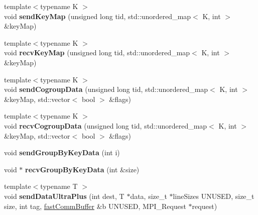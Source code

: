 \begin{DoxyCompactItemize}
\item 
\hypertarget{classfaster_1_1fastComm_a90b5d29b062108758932e1eefa22ab64}{}{\footnotesize template$<$typename K $>$ }\\void {\bfseries send\+Key\+Map} (unsigned long tid, std\+::unordered\+\_\+map$<$ K, int $>$ \&key\+Map)\label{classfaster_1_1fastComm_a90b5d29b062108758932e1eefa22ab64}

\item 
\hypertarget{classfaster_1_1fastComm_a4367717fa6627c940d777204a26b0a89}{}{\footnotesize template$<$typename K $>$ }\\void {\bfseries recv\+Key\+Map} (unsigned long tid, std\+::unordered\+\_\+map$<$ K, int $>$ \&key\+Map)\label{classfaster_1_1fastComm_a4367717fa6627c940d777204a26b0a89}

\item 
\hypertarget{classfaster_1_1fastComm_a1794035cdede41cb34034aa85fd510c3}{}{\footnotesize template$<$typename K $>$ }\\void {\bfseries send\+Cogroup\+Data} (unsigned long tid, std\+::unordered\+\_\+map$<$ K, int $>$ \&key\+Map, std\+::vector$<$ bool $>$ \&flags)\label{classfaster_1_1fastComm_a1794035cdede41cb34034aa85fd510c3}

\item 
\hypertarget{classfaster_1_1fastComm_ae7cea23c2c6dc47ac9e115685163d0c9}{}{\footnotesize template$<$typename K $>$ }\\void {\bfseries recv\+Cogroup\+Data} (unsigned long tid, std\+::unordered\+\_\+map$<$ K, int $>$ \&key\+Map, std\+::vector$<$ bool $>$ \&flags)\label{classfaster_1_1fastComm_ae7cea23c2c6dc47ac9e115685163d0c9}

\item 
\hypertarget{classfaster_1_1fastComm_a1c1f95981846c4ef1b5aca1d44ed6fdf}{}void {\bfseries send\+Group\+By\+Key\+Data} (int i)\label{classfaster_1_1fastComm_a1c1f95981846c4ef1b5aca1d44ed6fdf}

\item 
\hypertarget{classfaster_1_1fastComm_a973e9179e448b48785d20ad05d6f2fdd}{}void $\ast$ {\bfseries recv\+Group\+By\+Key\+Data} (int \&size)\label{classfaster_1_1fastComm_a973e9179e448b48785d20ad05d6f2fdd}

\item 
\hypertarget{classfaster_1_1fastComm_a5572027981936643d12277c7e47bf54d}{}{\footnotesize template$<$typename T $>$ }\\void {\bfseries send\+Data\+Ultra\+Plus} (int dest, T $\ast$data, size\+\_\+t $\ast$line\+Sizes U\+N\+U\+S\+E\+D, size\+\_\+t size, int tag, \hyperlink{classfaster_1_1fastCommBuffer}{fast\+Comm\+Buffer} \&b U\+N\+U\+S\+E\+D, M\+P\+I\+\_\+\+Request $\ast$request)\label{classfaster_1_1fastComm_a5572027981936643d12277c7e47bf54d}


\end{DoxyCompactItemize}
